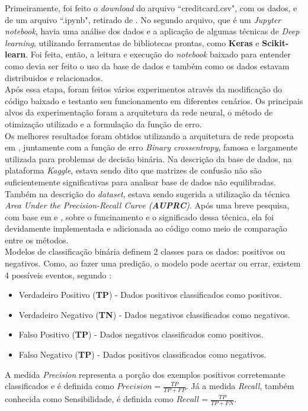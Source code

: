 \documentclass[a4paper,12pt]{article}
\begin{document}
Primeiramente, foi feito o \textit{download} do arquivo ``creditcard.csv", com os dados, e de um arquivo ``.ipynb", retirado de \cite{caraInternet}. No segundo arquivo, que é um \textit{Jupyter notebook}, havia uma análise dos dados e a aplicação de algumas técnicas de \textit{Deep learning}, utilizando ferramentas de bibliotecas prontas, como \textbf{Keras} e \textbf{Scikit-learn}. Foi feita, então, a leitura e execução do \textit{notebook} baixado para entender como devia ser feito o uso da base de dados e também como os dados estavam distribuidos e relacionados.\\ 

Após essa etapa, foram feitos vários experimentos através da modificação do código baixado e testanto seu funcionamento em diferentes cenários. Os principais alvos da experimentação foram a arquitetura da rede neural, o método de otimização utilizado e a formulação da função de erro.\\

Os melhores resultados foram obtidos utilizando a arquitetura de rede proposta em \cite{caraInternet}, juntamente com a função de erro \textit{Binary crossentropy}, famosa e largamente utilizada para problemas de decisão binária. Na descrição da base de dados, na plataforma \textit{Kaggle}, estava sendo dito que matrizes de confusão não são suficientemente significativas para analisar base de dados não equilibradas. Também na descrição do \textit{dataset}, estava sendo sugerida a utilização da técnica \textit{Area Under the Precision-Recall Curve (\textbf{AUPRC})}. Após uma breve pesquisa, com base em \cite{PRC} e \cite{PRC2}, sobre o funcinamento e o significado dessa técnica, ela foi devidamente implementada e adicionada ao código como meio de comparação entre os métodos.\\

Modelos de classificação binária definem 2 classes para os dados: positivos ou negativos. Como, ao fazer uma predição, o modelo pode acertar ou errar, existem 4 possíveis eventos, segundo \cite{PRC2}: 
\begin{itemize}
\item Verdadeiro Positivo (\textbf{TP}) - Dados positivos classificados como positivos.
\item Verdadeiro Negativo (\textbf{TN}) - Dados negativos classificados como negativos.
\item Falso Positivo (\textbf{TP}) - Dados negativos classificados como positivos.
\item Falso Negativo (\textbf{TP}) - Dados positivos classificados como negativos.
\end{itemize}
A medida \textit{Precision} representa a porção dos exemplos positivos corretemante classificados e é definida como $Precision = \frac{TP}{TP + FP}$. Já a medida \textit{Recall}, também conhecida como Sensibilidade, é definida como $Recall = \frac{TP}{TP + FN}$.
\end{document}
